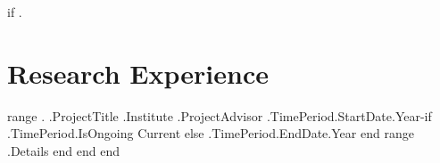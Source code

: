 {{if .}}
\section{Research Experience}
    \resumeSubHeadingListStart
    {{range .}}
        \resumeSubheading
        { {{.ProjectTitle }} }{ {{.Institute}} }
        { {{.ProjectAdvisor}} }{ {{.TimePeriod.StartDate.Year}}-{{if .TimePeriod.IsOngoing}} Current {{else}} {{.TimePeriod.EndDate.Year}} {{end}} }
        \resumeItemListStart
            {{range .Details}}
            {{end}}
            \resumeItemListEnd
    {{end}}
\resumeSubHeadingListEnd
{{end}}